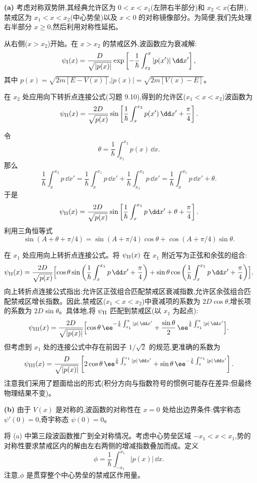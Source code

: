 \begin{solution}
\textbf{(a)} 考虑对称双势阱,其经典允许区为 $0<x<x_1$(左阱右半部分)和 $x_2<x$(右阱),禁戒区为 $x_1<x<x_2$(中心势垒)以及 $x<0$ 的对称镜像部分。为简便,我们先处理右半部分 $x\ge0$,然后利用对称性延拓。

从右侧($x>x_2$)开始。在 $x>x_2$ 的禁戒区外,波函数应为衰减解:
\[
\psi_{\rm I}(x)=\frac{D}{\sqrt{|p(x)|}}\exp\left[-\frac{1}{\hbar}\int_{x_2}^{x}|p(x')|\,\dd x'\right],
\]
其中 $p(x)=\sqrt{2m[E-V(x)]}$,$|p(x)|=\sqrt{2m[V(x)-E]}$。

在 $x_2$ 处应用向下转折点连接公式(习题 9.10),得到的允许区($x_1<x<x_2$)波函数为
\[
\psi_{\rm II}(x)=\frac{2D}{\sqrt{p(x)}}\sin\left[\frac{1}{\hbar}\int_x^{x_2}p(x')\,\dd x'+\frac{\pi}{4}\right].
\]

令
\[
\theta=\frac{1}{\hbar}\int_{x_1}^{x_2}p(x)\,\dd x.
\]
那么
\[
\frac{1}{\hbar}\int_x^{x_2}p\,\dd x'
=\frac{1}{\hbar}\int_x^{x_1}p\,\dd x'+\frac{1}{\hbar}\int_{x_1}^{x_2}p\,\dd x'
=\frac{1}{\hbar}\int_x^{x_1}p\,\dd x'+\theta.
\]
于是
\[
\psi_{\rm II}(x)=\frac{2D}{\sqrt{p(x)}}
\sin\left[\frac{1}{\hbar}\int_x^{x_1}p\,\dd x'+\theta+\frac{\pi}{4}\right].
\]
利用三角恒等式
\[
\sin(A+\theta+\pi/4)=\sin(A+\pi/4)\cos\theta+\cos(A+\pi/4)\sin\theta.
\]

在 $x_1$ 处应用向上转折点连接公式。将 $\psi_{\rm II}(x)$ 在 $x_1$ 附近写为正弦和余弦的组合:
\[
\psi_{\rm II}(x)=\frac{2D}{\sqrt{p(x)}}
\Bigl[\cos\theta\sin\left(\frac{1}{\hbar}\int_x^{x_1}p\,\dd x'+\frac{\pi}{4}\right)
+\sin\theta\cos\left(\frac{1}{\hbar}\int_x^{x_1}p\,\dd x'+\frac{\pi}{4}\right)\Bigr].
\]
向上转折点连接公式指出:允许区正弦组合匹配禁戒区衰减指数,允许区余弦组合匹配禁戒区增长指数。因此,禁戒区($x_1<x<x_2$)中衰减项的系数为 $2D\cos\theta$,增长项的系数为 $2D\sin\theta$。具体地,将 $\psi_{\rm II}$ 匹配到禁戒区(以 $x_1$ 为起点):
\[
\psi_{\rm III}(x)=\frac{2D}{\sqrt{|p(x)|}}
\Bigl[\cos\theta\,\ee^{-\frac{1}{\hbar}\int_{x_1}^{x}|p|\,\dd x'}
+\frac{\sin\theta}{2}\,\ee^{\frac{1}{\hbar}\int_{x_1}^{x}|p|\,\dd x'}\Bigr].
\]
但考虑到 $x_1$ 处的连接公式中存在前因子 $1/\sqrt2$ 的规范,更准确的系数为
\[
\psi_{\rm III}(x)=\frac{D}{\sqrt{|p(x)|}}
\left[2\cos\theta\,\ee^{\frac{1}{\hbar}\int_{x}^{x_1}|p|\,\dd x'}
+\sin\theta\,\ee^{-\frac{1}{\hbar}\int_{x}^{x_1}|p|\,\dd x'}\right].
\]
注意我们采用了题面给出的形式(积分方向与指数符号的惯例可能存在差异;但最终物理结果不变)。

\textbf{(b)} 由于 $V(x)$ 是对称的,波函数的对称性在 $x=0$ 处给出边界条件:偶宇称态 $\psi'(0)=0$,奇宇称态 $\psi(0)=0$。

将 (a) 中第三段波函数推广到全对称情况。考虑中心势垒区域 $-x_1<x<x_1$,势的对称性要求禁戒区内的解由左右两侧的增减指数叠加而成。定义
\[
\phi=\frac{1}{\hbar}\int_{-x_1}^{x_1}|p(x)|\,\dd x.
\]
注意,$\phi$ 是贯穿整个中心势垒的禁戒区作用量。


\end{solution}
